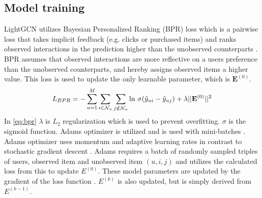 \subsection{Model training}
LightGCN utilizes Bayesian Personalized Ranking (BPR) loss which is a pairwise loss that takes implicit feedback (e.g. clicks or purchased items) and ranks observed interactions in the prediction higher than the unobserved counterparts \cite{lightgcn,BPR}.
BPR assumes that observed interactions are more reflective on a users preference than the unobserved counterparts, and hereby assigns observed items a higher value.
This loss is used to update the only learnable parameter, which is $\mathbf{E}^{(0)}$.
\begin{equation}
    L_{BPR} = - \sum^M_{u=1} \sum_{i \in \mathcal{N}_u} \sum_{j \notin \mathcal{N}_u} \textnormal{ln } \sigma (\hat{y}_{ui} - \hat{y}_{uj}) + \lambda||\mathbf{E}^{(0)}||^2 
    \label{eq:bpr}
\end{equation}
In \autoref{eq:bpr} $\lambda$ is $L_2$ regularization which is used to prevent overfitting. 
$\sigma$ is the sigmoid function.
Adams optimizer is utilized and is used with mini-batches \cite{lightgcn,Adams-optimizer}.
Adams optimizer uses momentum and adaptive learning rates in contrast to stochastic gradient descent \cite{Adams-optimizer}.
Adams requires a batch of randomly sampled triples of users, observed item and unobserved item $(u, i, j)$ and utilizes the calculated loss from this to update $E^{(0)}$.
These model parameters are updated by the gradient of the loss function \cite{NGCF_2019,Adams-optimizer}.
$E^{(k)}$ is also updated, but is simply derived from $E^{(k-1)}$.
